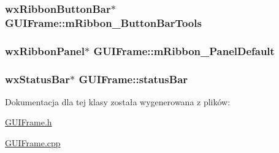 \hypertarget{class_g_u_i_frame_af716f8276acd84e4809ff152930e950a}{
\subsubsection[{m\+Ribbon\+\_\+\+Button\+Bar\+Tools}]{\setlength{\rightskip}{0pt plus 5cm}wx\+Ribbon\+Button\+Bar$\ast$ G\+U\+I\+Frame\+::m\+Ribbon\+\_\+\+Button\+Bar\+Tools\hspace{0.3cm}{\ttfamily [protected]}}}\label{class_g_u_i_frame_af716f8276acd84e4809ff152930e950a}
\hypertarget{class_g_u_i_frame_a9ed28512708a6780fa61e922432b8ce5}{
\subsubsection[{m\+Ribbon\+\_\+\+Panel\+Default}]{\setlength{\rightskip}{0pt plus 5cm}wx\+Ribbon\+Panel$\ast$ G\+U\+I\+Frame\+::m\+Ribbon\+\_\+\+Panel\+Default\hspace{0.3cm}{\ttfamily [protected]}}}\label{class_g_u_i_frame_a9ed28512708a6780fa61e922432b8ce5}
\hypertarget{class_g_u_i_frame_aaead1e3685f946f4cf2b37968300536d}{
\subsubsection[{status\+Bar}]{\setlength{\rightskip}{0pt plus 5cm}wx\+Status\+Bar$\ast$ G\+U\+I\+Frame\+::status\+Bar\hspace{0.3cm}{\ttfamily [protected]}}}\label{class_g_u_i_frame_aaead1e3685f946f4cf2b37968300536d}


Dokumentacja dla tej klasy została wygenerowana z plików\+:\begin{DoxyCompactItemize}
\item 
\hyperlink{_g_u_i_frame_8h}{G\+U\+I\+Frame.\+h}\item 
\hyperlink{_g_u_i_frame_8cpp}{G\+U\+I\+Frame.\+cpp}\end{DoxyCompactItemize}
